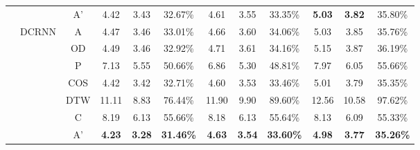 \begin{table}[t!]
\begin{center}
{\begin{tabular}{c|c|c|ccc|ccc|ccc}
                                               &                        & A'    & 4.42                                  & 3.43                                  & 32.67\%                               & 4.61          & 3.55          & 33.35\%          & \textbf{5.03} & \textbf{3.82} & 35.80\%          \\
                \cline{2-12}
                                               & \multirow{7}{*}{DCRNN} & A     & 4.47                                  & 3.46                                  & 33.01\%                               & 4.66          & 3.60          & 34.06\%          & 5.03          & 3.85          & 35.76\%          \\
                                               &                        & OD    & 4.49                                  & 3.46                                  & 32.92\%                               & 4.71          & 3.61          & 34.16\%          & 5.15          & 3.87          & 36.19\%          \\
                                               &                        & P     & 7.13                                  & 5.55                                  & 50.66\%                               & 6.86          & 5.30          & 48.81\%          & 7.97          & 6.05          & 55.66\%          \\
                                               &                        & COS   & 4.42                                  & 3.42                                  & 32.71\%                               & 4.60          & 3.53          & 33.46\%          & 5.01          & 3.79          & 35.35\%          \\
                                               &                        & DTW   & 11.11                                 & 8.83                                  & 76.44\%                               & 11.90         & 9.90          & 89.60\%          & 12.56         & 10.58         & 97.62\%          \\
                                               &                        & C     & 8.19                                  & 6.13                                  & 55.66\%                               & 8.18          & 6.13          & 55.64\%          & 8.13          & 6.09          & 55.33\%          \\
                                               &                        & A'    & \textbf{4.23}                         & \textbf{3.28}                         & \textbf{31.46\%}                      & \textbf{4.63} & \textbf{3.54} & \textbf{33.60\%} & \textbf{4.98} & \textbf{3.77} & \textbf{35.26\%} \\

\end{tabular}}
\end{center}
\end{table}
